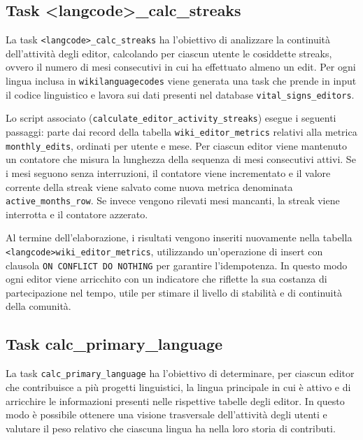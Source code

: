 \subsection{Task \textless langcode\textgreater\_calc\_streaks}
\label{subsec:calc_streaks}

La task \texttt{<langcode>\_calc\_streaks} ha l'obiettivo di analizzare la continuità dell'attività degli editor, calcolando per ciascun utente le cosiddette streaks, ovvero il numero di mesi consecutivi in cui ha effettuato almeno un edit. Per ogni lingua inclusa in \texttt{wikilanguagecodes} viene generata una task che prende in input il codice linguistico e lavora sui dati presenti nel database \texttt{vital\_signs\_editors}.

Lo script associato (\texttt{calculate\_editor\_activity\_streaks}) esegue i seguenti passaggi: parte dai record della tabella \texttt{wiki\_editor\_metrics} relativi alla metrica \texttt{monthly\_edits}, ordinati per utente e mese. Per ciascun editor viene mantenuto un contatore che misura la lunghezza della sequenza di mesi consecutivi attivi. Se i mesi seguono senza interruzioni, il contatore viene incrementato e il valore corrente della streak viene salvato come nuova metrica denominata \texttt{active\_months\_row}. Se invece vengono rilevati mesi mancanti, la streak viene interrotta e il contatore azzerato.

Al termine dell’elaborazione, i risultati vengono inseriti nuovamente nella tabella \texttt{<langcode>wiki\allowbreak\_editor\_metrics}, utilizzando un’operazione di insert con clausola \texttt{ON CONFLICT DO NOTHING} per garantire l’idempotenza. In questo modo ogni editor viene arricchito con un indicatore che riflette la sua costanza di partecipazione nel tempo, utile per stimare il livello di stabilità e di continuità della comunità.

\subsection{Task calc\_primary\_language}
\label{subsec:calc_primary_language}

La task \texttt{calc\_primary\_language} ha l’obiettivo di determinare, per ciascun editor che contribuisce a più progetti linguistici, la lingua principale in cui è attivo e di arricchire le informazioni presenti nelle rispettive tabelle degli editor. In questo modo è possibile ottenere una visione trasversale dell’attività degli utenti e valutare il peso relativo che ciascuna lingua ha nella loro storia di contributi.


